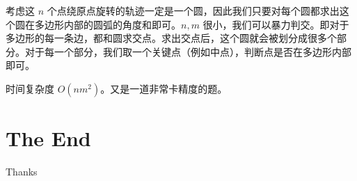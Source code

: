 \documentclass[10pt]{beamer}
\begin{document}
\begin{CJK}{UTF8}{gkai}
\begin{spacing}{1.2}
\begin{frame}
			考虑这 $n$ 个点绕原点旋转的轨迹一定是一个圆，因此我们只要对每个圆都求出这个圆在多边形内部的圆弧的角度和即可。$n,m$ 很小，我们可以暴力判交。即对于多边形的每一条边，都和圆求交点。求出交点后，这个圆就会被划分成很多个部分。对于每一个部分，我们取一个关键点（例如中点），判断点是否在多边形内部即可。\pause

			时间复杂度 $O(nm^2)$。又是一道非常卡精度的题。

		\end{frame}
		\section{The End}
		\begin{frame}
			\Huge{\centerline{Thanks}}
		\end{frame}

	\end{spacing}
\end{CJK}
\end{document}
